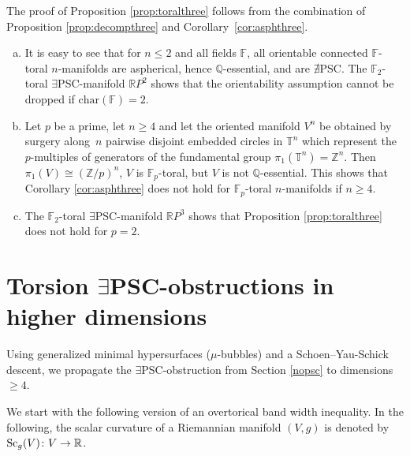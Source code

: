 \documentclass[pdftex]{sigma}
\numberwithin{equation}{section}
\newcommand{\F}{\mathbb{F}}
\newcommand{\Z}{\mathbb{Z}}
\newcommand{\R}{\mathbb{R}}
\newcommand{\TTT}{\mathbb{T}}
\newcommand{\charac}{\mathrm{char}}
\newcommand{\Sc}{{\rm Sc}}
\newcommand{\no}{{\color{brown!70!black}$\nexists$}{\sf PSC}}
\newcommand{\yes}{{\color {blue!70!black}$\exists$}{\sf PSC}}
\begin{document}
The proof of Proposition \ref{prop:toralthree} follows from the combination of Proposition \ref{prop:decompthree} and Corollary~\ref{cor:asphthree}.

\begin{Remark} \label{rem:mixed}\quad
\begin{enumerate}[(a)]\itemsep=0pt
\item \label{leqzwei} It is easy to see that for $n \leq 2$ and all fields $\F$, all orientable connected $ \F$-toral $n$-manifolds are aspherical, hence $\mathbb{Q}$-essential, and are \no.
The $\F_2$-toral \yes-manifold $\mathbb{R}P^2$ shows that the orientability assumption cannot be dropped if $\charac(\F) = 2$.
\item \label{notinge4} Let $p$ be a prime, let $n \geq 4$ and let the oriented manifold $V^n$ be obtained by surgery along~$n$ pairwise disjoint embedded circles in $\TTT^n$ which represent the $p$-multiples of generators of the fundamental group $\pi_1({\TTT}^n) = \Z^n$.
Then $\pi_1(V) \cong (\Z/p)^n$, $V$ is $\F_p$-toral, but $V$ is not $\mathbb{Q}$-essential.
This shows that Corollary \ref{cor:asphthree} does not hold for $\F_p$-toral $n$-manifolds if $n \geq 4$.
\item The $\F_2$-toral \yes-manifold $\mathbb{R} P^3$ shows that Proposition \ref{prop:toralthree} does not hold for $p= 2$.
\end{enumerate}
\end{Remark}

\section[Torsion PSC-obstructions in higher dimensions]{Torsion \yes-obstructions in higher dimensions}

Using generalized minimal hypersurfaces ($\mu$-bubbles) and a Schoen--Yau-Schick descent, we propagate the \yes-obstruction from Section \ref{nopsc} to dimensions $\geq 4$.

We start with the following version of an overtorical band width inequality.
In the following, the scalar curvature of a Riemannian manifold $(V,g)$ is denoted by $\Sc_g(V) \colon V \to \R$.
\end{document}

